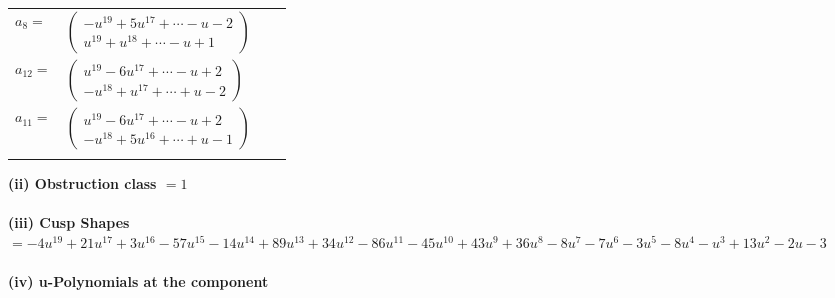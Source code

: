 \documentclass[1p]{elsarticle_modified}
\theoremstyle{definition}
\begin{document}
\begin{tabular}{m{7pt} m{180pt} m{7pt} m{180pt} }
\flushright $a_{8}=$&$\begin{pmatrix}- u^{19}+5 u^{17}+\cdots- u-2\\u^{19}+u^{18}+\cdots- u+1\end{pmatrix}$ \\
\flushright $a_{12}=$&$\begin{pmatrix}u^{19}-6 u^{17}+\cdots- u+2\\- u^{18}+u^{17}+\cdots+u-2\end{pmatrix}$ \\
\flushright $a_{11}=$&$\begin{pmatrix}u^{19}-6 u^{17}+\cdots- u+2\\- u^{18}+5 u^{16}+\cdots+u-1\end{pmatrix}$\\&\end{tabular}
\flushleft \textbf{(ii) Obstruction class $= 1$}\\~\\
\flushleft \textbf{(iii) Cusp Shapes $= -4 u^{19}+21 u^{17}+3 u^{16}-57 u^{15}-14 u^{14}+89 u^{13}+34 u^{12}-86 u^{11}-45 u^{10}+43 u^9+36 u^8-8 u^7-7 u^6-3 u^5-8 u^4- u^3+13 u^2-2 u-3$}\\~\\
\newpage\renewcommand{\arraystretch}{1}
\flushleft \textbf{(iv) u-Polynomials at the component}\newline \\
\end{document}
